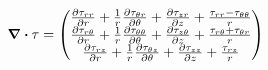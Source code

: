 \begin{equation}
	\div\tau = \pmqty{\pdv{\tau_{rr}}{r}+\frac{1}{r}\pdv{\tau_{\theta r}}{\theta}+\pdv{\tau_{zr}}{z}+\frac{\tau_{rr}-\tau_{\theta\theta}}{r}\\
			\pdv{\tau_{r\theta}}{r}+\frac{1}{r}\pdv{\tau_{\theta\theta}}{\theta}+\pdv{\tau_{z\theta}}{z}+\frac{\tau_{r\theta}+\tau_{\theta r}}{r}\\ \pdv{\tau_{rz}}{r}+\frac{1}{r}\pdv{\tau_{\theta z}}{\theta}+\pdv{\tau_{zz}}{z}+\frac{\tau_{rz}}{r}}
\end{equation}